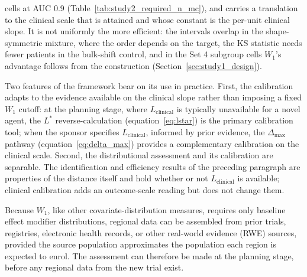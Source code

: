 \documentclass[AMA,Times1COL]{WileyNJDv5}
\begin{document}
 cells at AUC 0.9 (Table~\ref{tab:study2_required_n_mc}), and carries a translation to the clinical scale that is attained and whose constant is the per-unit clinical slope. It is not uniformly the more efficient: the intervals overlap in the shape-symmetric mixture, where the order depends on the target, the KS statistic needs fewer patients in the bulk-shift control, and in the Set 4 subgroup cells $W_1$'s advantage follows from the construction (Section~\ref{sec:study1_design}).

Two features of the framework bear on its use in practice. First, the calibration adapts to the evidence available on the clinical slope rather than imposing a fixed $W_1$ cutoff: at the planning stage, where $L_{\text{clinical}}$ is typically unavailable for a novel agent, the $L^*$ reverse-calculation (equation~\ref{eq:lstar}) is the primary calibration tool; when the sponsor specifies $L_{\text{clinical}}$, informed by prior evidence, the $\Delta_{\max}$ pathway (equation~\ref{eq:delta_max}) provides a complementary calibration on the clinical scale. Second, the distributional assessment and its calibration are separable. The identification and efficiency results of the preceding paragraph are properties of the distance itself and hold whether or not $L_{\text{clinical}}$ is available; clinical calibration adds an outcome-scale reading but does not change them.


Because $W_1$, like other covariate-distribution measures, requires only baseline effect modifier distributions, regional data can be assembled from prior trials, registries, electronic health records, or other real-world evidence (RWE) sources, provided the source population approximates the population each region is expected to enrol. The assessment can therefore be made at the planning stage, before any regional data from the new trial exist.
\end{document}
